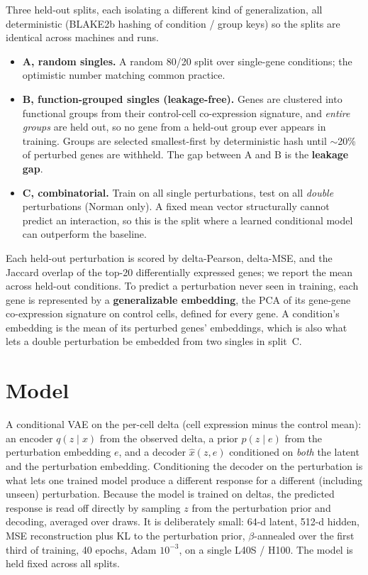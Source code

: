\documentclass[11pt]{article}
\begin{document}
Three held-out splits, each isolating a different kind of generalization, all
deterministic (BLAKE2b hashing of condition / group keys) so the splits are
identical across machines and runs.

\begin{itemize}
\item \textbf{A, random singles.} A random 80/20 split over single-gene
conditions; the optimistic number matching common practice.
\item \textbf{B, function-grouped singles (leakage-free).} Genes are clustered
into functional groups from their control-cell co-expression signature, and
\emph{entire groups} are held out, so no gene from a held-out group ever appears
in training. Groups are selected smallest-first by deterministic hash until
$\sim$20\% of perturbed genes are withheld. The gap between A and B is the
\textbf{leakage gap}.
\item \textbf{C, combinatorial.} Train on all single perturbations, test on all
\emph{double} perturbations (Norman only). A fixed mean vector structurally
cannot predict an interaction, so this is the split where a learned conditional
model can outperform the baseline.
\end{itemize}

Each held-out perturbation is scored by delta-Pearson, delta-MSE, and the Jaccard
overlap of the top-20 differentially expressed genes; we report the mean across
held-out conditions. To predict a perturbation never seen in training, each gene
is represented by a \textbf{generalizable embedding}, the PCA of its gene-gene
co-expression signature on control cells, defined for every gene. A condition's
embedding is the mean of its perturbed genes' embeddings, which is also what lets
a double perturbation be embedded from two singles in split~C.

\section{Model}

A conditional VAE on the per-cell delta (cell expression minus the control mean):
an encoder $q(z\mid x)$ from the observed delta, a prior $p(z\mid e)$ from the
perturbation embedding $e$, and a decoder $\hat{x}(z,e)$ conditioned on
\emph{both} the latent and the perturbation embedding. Conditioning the decoder
on the perturbation is what lets one trained model produce a different response
for a different (including unseen) perturbation. Because the model is trained on
deltas, the predicted response is read off directly by sampling $z$ from the
perturbation prior and decoding, averaged over draws. It is deliberately small:
64-d latent, 512-d hidden, MSE reconstruction plus KL to the perturbation prior,
$\beta$-annealed over the first third of training, 40 epochs, Adam $10^{-3}$, on a
single L40S / H100. The model is held fixed across all splits.
\end{document}
